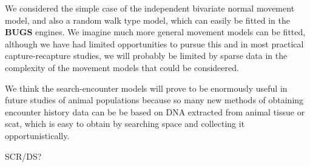 We 
considered the simple case of the independent bivariate normal
movement model, and also a random walk type model, which can easily be
fitted in the {\bf BUGS} engines.  We imagine much more general
movement models can be fitted, although we have had limited
opportunities to pursue this and in most practical capture-recapture
studies, we will probably be limited by sparse data in the complexity
of the movement models that could be consideered. 

We think the search-encounter models will prove to be enormously
useful in future studies of animal populations because so many new
methods of obtaining encounter history data can be be based on DNA
extracted from animal tissue or scat, which is easy to obtain by
searching space and collecting it opportunistically. 


SCR/DS?